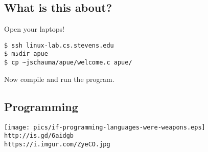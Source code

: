 \documentclass[xga]{xdvislides}
\begin{document}
\subsection{What is this about?}
\Hugesize
\vspace*{\fill}
\begin{center}
Open your laptops!
\end{center}
\begin{verbatim}
$ ssh linux-lab.cs.stevens.edu
$ mذdir apue
$ cp ~jschauma/apue/welcome.c apue/
\end{verbatim}
\vspace{.5in}
Now compile and run the program.
\vspace*{\fill}
\Normalsize


\subsection{Programming}
\begin{center}
\texttt{[image: pics/if-programming-languages-were-weapons.eps]} \\
\vspace{.5in}
\verb+http://is.gd/6aidgb+ \\
\verb+https://i.imgur.com/ZyeCO.jpg+
\end{center}
\end{document}
